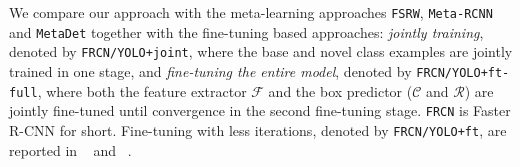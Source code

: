  We compare our approach with the meta-learning approaches \texttt{FSRW}, \texttt{Meta-RCNN} and \texttt{MetaDet} together with the fine-tuning
based approaches:  \emph{jointly training}, denoted by \texttt{FRCN/YOLO+joint}, where the base and novel class examples are jointly trained in one stage,  and \emph{fine-tuning the entire model}, denoted by \texttt{FRCN/YOLO+ft-full}, where both the feature extractor $\mathcal{F}$ and the box predictor ($\mathcal{C}$ and $\mathcal{R}$) are jointly fine-tuned until convergence in the second fine-tuning stage. \texttt{FRCN} is Faster R-CNN for short. Fine-tuning with less iterations, denoted by \texttt{FRCN/YOLO+ft}, are reported in ~\citet{kang2019few} and ~\citet{yan2019meta}.




